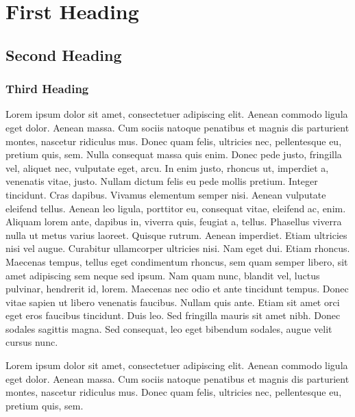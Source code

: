 \documentclass[11pt,a4paper]{scrreprt}
\begin{document}
\chapter{First Heading} \label{chap:first-heading}

\section{Second Heading} \label{sec:second-heading}

\subsection{Third Heading} \label{subsec:third-heading}

Lorem ipsum dolor sit amet, consectetuer adipiscing elit. Aenean commodo ligula eget dolor. Aenean massa. Cum sociis natoque penatibus et magnis dis parturient montes, nascetur ridiculus mus. Donec quam felis, ultricies nec, pellentesque eu, pretium quis, sem. Nulla consequat massa quis enim. Donec pede justo, fringilla vel, aliquet nec, vulputate eget, arcu. In enim justo, rhoncus ut, imperdiet a, venenatis vitae, justo. Nullam dictum felis eu pede mollis pretium. Integer tincidunt. Cras dapibus. Vivamus elementum semper nisi. Aenean vulputate eleifend tellus. Aenean leo ligula, porttitor eu, consequat vitae, eleifend ac, enim. Aliquam lorem ante, dapibus in, viverra quis, feugiat a, tellus. Phasellus viverra nulla ut metus varius laoreet. Quisque rutrum. Aenean imperdiet. Etiam ultricies nisi vel augue. Curabitur ullamcorper ultricies nisi. Nam eget dui. Etiam rhoncus. Maecenas tempus, tellus eget condimentum rhoncus, sem quam semper libero, sit amet adipiscing sem neque sed ipsum. Nam quam nunc, blandit vel, luctus pulvinar, hendrerit id, lorem. Maecenas nec odio et ante tincidunt tempus. Donec vitae sapien ut libero venenatis faucibus. Nullam quis ante. Etiam sit amet orci eget eros faucibus tincidunt. Duis leo. Sed fringilla mauris sit amet nibh. Donec sodales sagittis magna. Sed consequat, leo eget bibendum sodales, augue velit cursus nunc.

\begin{displayquote}
Lorem ipsum dolor sit amet, consectetuer adipiscing elit. Aenean commodo ligula eget dolor. Aenean massa. Cum sociis natoque penatibus et magnis dis parturient montes, nascetur ridiculus mus. Donec quam felis, ultricies nec, pellentesque eu, pretium quis, sem.
\end{displayquote}
\noindent
\end{document}
